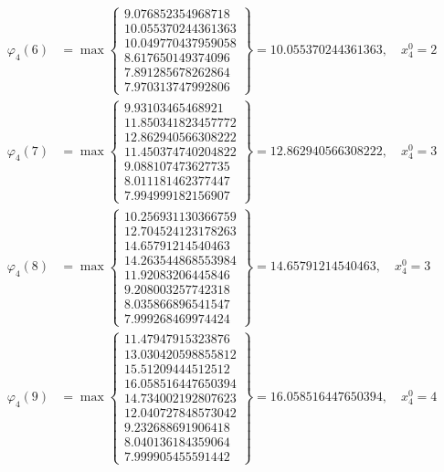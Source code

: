 \documentclass{article}
\begin{document}
\begin{align*}
  
\varphi_{4}(6) &= \max \left\{ \begin{array}{c}
9.076852354968718 \\
 10.055370244361363 \\
 10.049770437959058 \\
 8.617650149374096 \\
 7.891285678262864 \\
 7.970313747992806
\end{array} \right\} = 10.055370244361363, \quad x_{4}^0 = 2\\
  
  
  
  
\varphi_{4}(7) &= \max \left\{ \begin{array}{c}
9.93103465468921 \\
 11.850341823457772 \\
 12.862940566308222 \\
 11.450374740204822 \\
 9.088107473627735 \\
 8.011181462377447 \\
 7.994999182156907
\end{array} \right\} = 12.862940566308222, \quad x_{4}^0 = 3\\
  
  
  
  
\varphi_{4}(8) &= \max \left\{ \begin{array}{c}
10.256931130366759 \\
 12.704524123178263 \\
 14.65791214540463 \\
 14.263544868553984 \\
 11.92083206445846 \\
 9.208003257742318 \\
 8.035866896541547 \\
 7.999268469974424
\end{array} \right\} = 14.65791214540463, \quad x_{4}^0 = 3\\
  
  
  
  
\varphi_{4}(9) &= \max \left\{ \begin{array}{c}
11.47947915323876 \\
 13.030420598855812 \\
 15.51209444512512 \\
 16.058516447650394 \\
 14.734002192807623 \\
 12.040727848573042 \\
 9.232688691906418 \\
 8.040136184359064 \\
 7.999905455591442
\end{array} \right\} = 16.058516447650394, \quad x_{4}^0 = 4\\
  

\end{align*}
\end{document}
